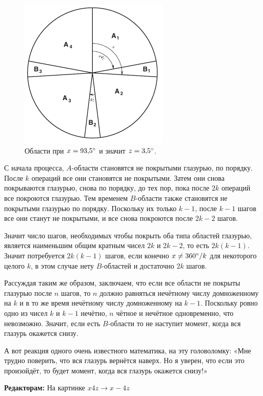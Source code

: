 \begin{figure}[htb!]
\centering
\includegraphics[scale=1]{pics/tort3}
\caption{Области при $x = 93{,}5\degree$ и значит $z = 3{,}5\degree$.}
\label{pic:tort3}
\end{figure}

С начала процесса, $A$-области становятся не покрытыми глазурью, по порядку.
После $k$ операций все они становятся не покрытыми.
Затем они снова покрываются глазурью, снова по порядку, до тех пор, пока после $2k$ операций все покроются глазурью.
Тем временем $B$-области также становятся не покрытыми глазурью по порядку.
Поскольку их только $k - 1$, после $k - 1$ шагов все они станут не покрытыми, и все снова покроются после $2k - 2$ шагов.

Значит число шагов, необходимых чтобы покрыть оба типа областей глазурью, является наименьшим общим кратным чисел $2k$ и $2k - 2$, то есть $2k(k - 1)$.
Значит потребуется $2k(k - 1)$ шагов, если конечно $x \ne 360\degree/k$ для некоторого целого $k$, в этом случае нету $B$-областей и достаточно $2k$ шагов.

Рассуждая таким же образом, заключаем, что если все области не покрыты глазурью после $n$ шагов,
то $n$ должно равняться нечётному числу домноженному на $k$
и в то же время нечётному числу домноженному на $k - 1$.
Поскольку ровно одно из чисел $k$ и $k - 1$ нечётно, $n$ чётное и нечётное одновременно,
что невозможно.
Значит, если есть $B$-области то не наступит момент, когда вся глазурь окажется снизу.

А вот реакция одного очень известного математика, на эту головоломку: «Мне трудно поверить, что вся глазурь вернётся наверх.
Но я уверен, что если это произойдёт, то будет момент, когда вся глазурь окажется снизу!»

\begin{addedbytheeditors}
\textbf{Редакторам:} На картинке $x4z\to x-4z$
\end{addedbytheeditors}

